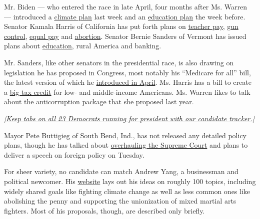 Mr. Biden --- who entered the race in late April, four months after Ms.
Warren --- introduced a
\href{https://www.nytimes3xbfgragh.onion/2019/06/04/us/politics/joe-biden-climate-plan.html}{climate
plan} last week and an
\href{https://www.nytimes3xbfgragh.onion/2019/05/28/us/politics/biden-education-plan-2020.html}{education
plan} the week before. Senator Kamala Harris of California has put forth
plans on
\href{https://www.nytimes3xbfgragh.onion/2019/03/26/us/politics/kamala-harris-teacher-pay.html}{teacher
pay},
\href{https://www.nytimes3xbfgragh.onion/2019/04/22/us/politics/kamala-harris-gun-control.html}{gun
control},
\href{https://www.nytimes3xbfgragh.onion/2019/05/20/us/politics/kamala-harris-gender-pay-gap.html}{equal
pay} and
\href{https://www.nytimes3xbfgragh.onion/2019/05/28/us/politics/kamala-harris-abortion.html}{abortion}.
Senator Bernie Sanders of Vermont has issued plans about
\href{https://www.nytimes3xbfgragh.onion/2019/05/18/us/bernie-sanders-education-plan.html}{education},
rural America and banking.

Mr. Sanders, like other senators in the presidential race, is also
drawing on legislation he has proposed in Congress, most notably his
``Medicare for all'' bill, the latest version of which he
\href{https://www.nytimes3xbfgragh.onion/2019/04/10/us/politics/bernie-sanders-medicare-for-all.html}{introduced
in April}. Ms. Harris has a bill to create a
\href{https://www.nytimes3xbfgragh.onion/2019/05/22/business/democrats-taxes-middle-class.html}{big
tax credit} for low- and middle-income Americans. Ms. Warren likes to
talk about the anticorruption package that she proposed last year.

\emph{{[}}\href{https://www.nytimes3xbfgragh.onion/interactive/2019/us/politics/2020-presidential-candidates.html?action=click\&module=Intentional\&pgtype=Article}{\emph{Keep
tabs on all 23 Democrats running for president with our candidate
tracker.}}\emph{{]}}

Mayor Pete Buttigieg of South Bend, Ind., has not released any detailed
policy plans, though he has talked about
\href{https://www.nbcnews.com/politics/2020-election/inside-pete-buttigieg-s-plan-overhaul-supreme-court-n1012491}{overhauling
the Supreme Court} and plans to deliver a speech on foreign policy on
Tuesday.

For sheer variety, no candidate can match Andrew Yang, a businessman and
political newcomer. His
\href{https://www.yang2020.com/policies/}{website} lays out his ideas on
roughly 100 topics, including widely shared goals like fighting climate
change as well as less common ones like abolishing the penny and
supporting the unionization of mixed martial arts fighters. Most of his
proposals, though, are described only briefly.

